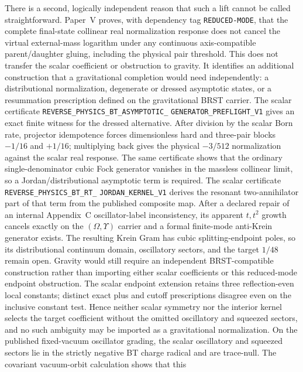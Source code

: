 \documentclass[11pt]{article}
\theoremstyle{definition}
\theoremstyle{remark}
\begin{document}
There is a second, logically independent reason that such a lift cannot
be called straightforward.  Paper~V \cite{paperV} proves, with dependency tag
\texttt{REDUCED-MODE}, that the complete
final-state collinear real normalization response does not cancel the virtual
external-mass logarithm under any continuous axis-compatible parent/daughter
gluing, including the physical pair threshold.  This does not transfer the
scalar coefficient or obstruction to gravity.  It identifies an additional
construction that a gravitational completion would need independently: a
distributional normalization, degenerate or dressed asymptotic states, or a
resummation prescription defined on the gravitational BRST carrier.
The scalar certificate
\texttt{REVERSE\_PHYSICS\_BT\_ASYMPTOTIC\_}\allowbreak
\texttt{GENERATOR\_PREFLIGHT\_V1}
gives an exact finite witness for the dressed alternative.  After division
by the scalar Born rate, projector idempotence forces dimensionless hard and
three-pair blocks $-1/16$ and $+1/16$; multiplying back gives the physical
$-3/512$ normalization against the scalar real response.  The same certificate
shows that the ordinary single-denominator cubic Fock generator vanishes in
the massless collinear limit, so a Jordan/distributional asymptotic term is
required.  The scalar certificate
\texttt{REVERSE\_PHYSICS\_BT\_RT\_}
\allowbreak\texttt{JORDAN\_KERNEL\_V1} derives the resonant
two-annihilator part of that term from the published composite map.  After a
declared repair of an internal Appendix~C oscillator-label inconsistency, its
apparent $t,t^2$ growth cancels exactly on the $(\Omega,\Upsilon)$ carrier and
a formal finite-mode anti-Krein generator exists.  The resulting Krein Gram
has cubic splitting-endpoint poles, so its distributional continuum domain,
oscillatory sectors, and the target $1/48$ remain open.  Gravity would still
require an independent BRST-compatible construction rather than importing
either scalar coefficients or this reduced-mode endpoint obstruction.
The scalar endpoint extension retains three
reflection-even local constants; distinct exact plus and cutoff prescriptions
disagree even on the inclusive constant test.  Hence neither scalar symmetry
nor the interior kernel selects the target coefficient without the omitted
oscillatory and squeezed sectors, and no such ambiguity may be imported as a
gravitational normalization.
On the published fixed-vacuum oscillator grading, the scalar oscillatory and
squeezed sectors lie in the strictly negative BT charge radical and are
trace-null.  The covariant vacuum-orbit calculation shows that this
\end{document}
